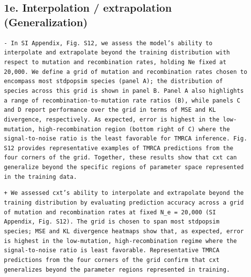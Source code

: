 \documentclass[10pt]{article}
\newcommand{\rem}[1]{\par\noindent\colorbox{rembg}{\parbox{\dimexpr\linewidth-2\fboxsep}{\small\textcolor{remtext}{\texttt{-\ #1}}}}}
\newcommand{\add}[1]{\par\noindent\colorbox{addbg}{\parbox{\dimexpr\linewidth-2\fboxsep}{\small\textcolor{addtext}{\texttt{+\ #1}}}}}
\begin{document}
\subsection*{\small 1e. Interpolation / extrapolation (Generalization)}
\begin{mdframed}[style=diffbox]
\rem{In SI Appendix, Fig. S12, we assess the model's ability to interpolate and extrapolate beyond the training distribution with respect to mutation and recombination rates, holding Ne fixed at 20,000. We define a grid of mutation and recombination rates chosen to encompass most stdpopsim species (panel A); the distribution of species across this grid is shown in panel B. Panel A also highlights a range of recombination-to-mutation rate ratios (B), while panels C and D report performance over the grid in terms of MSE and KL divergence, respectively. As expected, error is highest in the low-mutation, high-recombination region (bottom right of C) where the signal-to-noise ratio is the least favorable for TMRCA inference. Fig. S12 provides representative examples of TMRCA predictions from the four corners of the grid. Together, these results show that cxt can generalize beyond the specific regions of parameter space represented in the training data.}
\add{We assessed cxt's ability to interpolate and extrapolate beyond the training distribution by evaluating prediction accuracy across a grid of mutation and recombination rates at fixed N\_e = 20,000 (SI Appendix, Fig. S12). The grid is chosen to span most stdpopsim species; MSE and KL divergence heatmaps show that, as expected, error is highest in the low-mutation, high-recombination regime where the signal-to-noise ratio is least favorable. Representative TMRCA predictions from the four corners of the grid confirm that cxt generalizes beyond the parameter regions represented in training.}
\end{mdframed}
\end{document}
